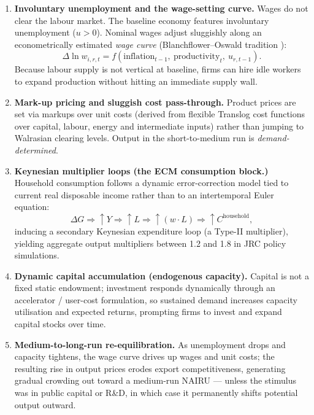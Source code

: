 \begin{enumerate}
\item \textbf{Involuntary unemployment and the wage-setting curve.} Wages do
  not clear the labour market. The baseline economy features involuntary
  unemployment ($u > 0$). Nominal wages adjust sluggishly along an
  econometrically estimated \emph{wage curve} (Blanchflower--Oswald
  tradition \citep{BlanchflowerOswald.1995}):
  \[
  \Delta \ln w_{i,r,t} = f(\text{inflation}_{t-1},\ \text{productivity}_{t},\ u_{r,t-1}).
  \]
  Because labour supply is not vertical at baseline, firms can hire idle
  workers to expand production without hitting an immediate supply wall.
\item \textbf{Mark-up pricing and sluggish cost pass-through.} Product prices
  are set via markups over unit costs (derived from flexible Translog cost
  functions over capital, labour, energy and intermediate inputs) rather than
  jumping to Walrasian clearing levels. Output in the short-to-medium run is
  \emph{demand-determined}.
\item \textbf{Keynesian multiplier loops (the ECM consumption block.)}
  Household consumption follows a dynamic error-correction model tied to
  current real disposable income rather than to an intertemporal Euler
  equation:
  \[
  \Delta G \Rightarrow \uparrow Y \Rightarrow \uparrow L
  \Rightarrow \uparrow (w\cdot L) \Rightarrow \uparrow C^{\text{household}},
  \]
  inducing a secondary Keynesian expenditure loop (a Type-II multiplier),
  yielding aggregate output multipliers between 1.2 and 1.8 in JRC policy
  simulations.
\item \textbf{Dynamic capital accumulation (endogenous capacity).} Capital is
  not a fixed static endowment; investment responds dynamically through an
  accelerator / user-cost formulation, so sustained demand increases capacity
  utilisation and expected returns, prompting firms to invest and expand
  capital stocks over time.
\item \textbf{Medium-to-long-run re-equilibration.} As unemployment drops and
  capacity tightens, the wage curve drives up wages and unit costs; the
  resulting rise in output prices erodes export competitiveness, generating
  gradual crowding out toward a medium-run NAIRU --- unless the stimulus was
  in public capital or R\&D, in which case it permanently shifts potential
  output outward.
\end{enumerate}

